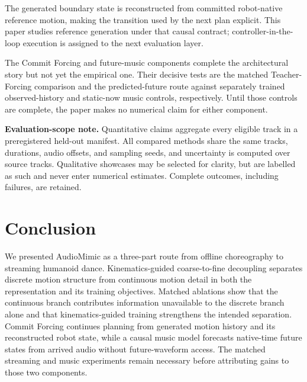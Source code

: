 \documentclass[conference]{IEEEtran}
\newcommand{\method}{AudioMimic}
\newcommand{\cof}{Commit Forcing}
\newif\ifshowpapertodos
\newcommand{\papertodo}[1]{%
\ifshowpapertodos
\par\smallskip\noindent
{\color{red!75!black}\textbf{TODO:} #1}
\smallskip\par
\fi}
\begin{document}
The generated boundary state is reconstructed from committed robot-native reference motion, making the transition used by the next plan explicit. This paper studies reference generation under that causal contract; controller-in-the-loop execution is assigned to the next evaluation layer.

The \cof{} and future-music components complete the architectural story but not yet the empirical one. Their decisive tests are the matched Teacher-Forcing comparison and the predicted-future route against separately trained observed-history and static-now music controls, respectively. Until those controls are complete, the paper makes no numerical claim for either component.

\textbf{Evaluation-scope note.} Quantitative claims aggregate every eligible track in a
preregistered held-out manifest. All compared methods share the same tracks, durations,
audio offsets, and sampling seeds, and uncertainty is computed over source tracks.
Qualitative showcases may be selected for clarity, but are labelled as such and never
enter numerical estimates. Complete outcomes, including failures, are retained.

\papertodo{Before submission, add one edited real-G1 hero video assembled from the strongest selected moments under one frozen controller and safety protocol. Keep playback at real speed, make cuts visible, and retain at least five continuous seconds per shot. Use it only to establish local physical plausibility; do not claim uninterrupted 60-second execution, long-horizon hardware stability, style coverage, representative success, quantitative hardware benefit, controller robustness, success rate, or superiority over Teacher Forcing. Retain all unedited source captures, cuts, failures, interventions, and the selection record, and add this requirement to the final consolidated GitHub experiment issue. Until the video is accepted, retain the current reference-generation scope.}

\section{Conclusion}
We presented \method{} as a three-part route from offline choreography to streaming humanoid dance. Kinematics-guided coarse-to-fine decoupling separates discrete motion structure from continuous motion detail in both the representation and its training objectives. Matched ablations show that the continuous branch contributes information unavailable to the discrete branch alone and that kinematics-guided training strengthens the intended separation. \cof{} continues planning from generated motion history and its reconstructed robot state, while a causal music model forecasts native-time future states from arrived audio without future-waveform access. The matched streaming and music experiments remain necessary before attributing gains to those two components.



\end{document}
